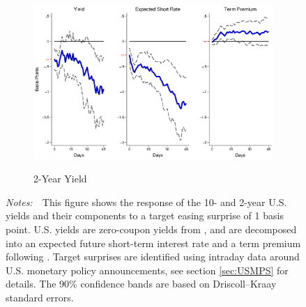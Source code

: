 \documentclass[a4paper, 12pt]{article}
\newcommand{\figtext}[1]{
	\vspace{-1ex}
	\captionsetup{justification=justified,font=footnotesize}
	\caption*{#1}
}
\newcommand{\fignotes}[1]{\figtext{\emph{Notes:~}~#1}}
\begin{document}
\begin{appendices}
\begin{landscape}
\begin{figure}[tbph]
\begin{center}
\begin{minipage}{\linewidth}
\begin{center}
						\begin{subfigure}[t]{\linewidth}
							\includegraphics[trim={0cm 0cm 0cm 0cm},clip,height=0.35\textheight,width=\linewidth]{../Figures/TargetUSDnomyptp24m.eps} \\
							\vspace{-0.35cm}
							\caption{2-Year Yield} \label{subfig:LPUS2Ytarget}
						\end{subfigure}
						\vspace{-0.45cm}
					\end{center}
					\fignotes{This figure shows the response of the 10- and 2-year U.S. yields and their components to a target easing surprise of 1 basis point. U.S. yields are zero-coupon yields from \cite{GSW:2007}, and are decomposed into an expected future short-term interest rate and a term premium following \cite{KimWright:2005}. Target surprises are identified using intraday data around U.S. monetary policy announcements, see section \ref{sec:USMPS} for details. The 90\% confidence bands are based on Driscoll--Kraay standard errors.}
				\end{minipage}
			\end{center}
		\end{figure}
		
		\pagebreak[4]
		

\end{landscape}
\end{appendices}
\end{document}
